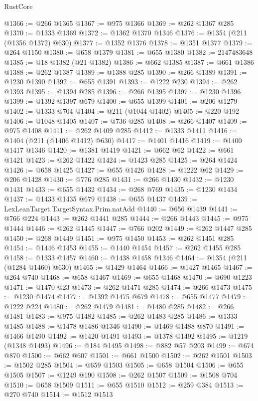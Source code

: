 \begin{lexlean}{RustCore}
\begin{coremodule}
@1366 := @266 @1365
@1367 := @975 @1366
@1369 := @262 @1367 @285
@1370 := @1333 @1369
@1372 := @1362 @1370 @1346
@1376 := @1354 (@211 (@1356 @1372) @630)
@1377 := @1352 @1376
@1378 := @1351 @1377
@1379 := @264 @1150
@1380 := @658 @1379
@1381 := @655 @1380
@1382 := 2147483648
@1385 := @18 @1382 (@21 @1382)
@1386 := @662 @1385
@1387 := @661 @1386
@1388 := @262 @1387
@1389 := @1388 @285
@1390 := @266 @1389
@1391 := @1230 @1390
@1392 := @655 @1391
@1393 := @1222 @230
@1394 := @262 @1393
@1395 := @1394 @285
@1396 := @266 @1395
@1397 := @1230 @1396
@1399 := @1392 @1397 @679
@1400 := @655 @1399
@1401 := @206 @1279
@1402 := @1333 @704
@1404 := @211 (@1044 @1402)
@1405 := @220 @192
@1406 := @1048 @1405
@1407 := @736 @285
@1408 := @266 @1407
@1409 := @975 @1408
@1411 := @262 @1409 @285
@1412 := @1333 @1411
@1416 := @1404 (@211 (@1406 @1412) @630)
@1417 := @1401 @1416
@1419 := @1400 @1417 @1346
@1420 := @1381 @1419
@1421 := @662 @62
@1422 := @661 @1421
@1423 := @262 @1422
@1424 := @1423 @285
@1425 := @264 @1424
@1426 := @658 @1425
@1427 := @655 @1426
@1428 := @1222 @62
@1429 := @206 @1428
@1430 := @776 @285
@1431 := @266 @1430
@1432 := @1230 @1431
@1433 := @655 @1432
@1434 := @268 @769
@1435 := @1230 @1434
@1437 := @1433 @1435 @679
@1438 := @655 @1437
@1439 := LexLeanTarget.TargetSyntax.Prim.natAdd
@1440 := @656 @1439
@1441 := @766 @224
@1443 := @262 @1441 @285
@1444 := @266 @1443
@1445 := @975 @1444
@1446 := @262 @1445
@1447 := @766 @202
@1449 := @262 @1447 @285
@1450 := @268 @1449
@1451 := @975 @1450
@1453 := @262 @1451 @285
@1454 := @1446 @1453
@1455 := @1440 @1454
@1457 := @262 @1455 @285
@1458 := @1333 @1457
@1460 := @1438 @1458 @1346
@1464 := @1354 (@211 (@1284 @1460) @630)
@1465 := @1429 @1464
@1466 := @1427 @1465
@1467 := @264 @740
@1468 := @658 @1467
@1469 := @655 @1468
@1470 := @690 @1223
@1471 := @1470 @23
@1473 := @262 @1471 @285
@1474 := @266 @1473
@1475 := @1230 @1474
@1477 := @1392 @1475 @679
@1478 := @655 @1477
@1479 := @1222 @224
@1480 := @262 @1479
@1481 := @1480 @285
@1482 := @266 @1481
@1483 := @975 @1482
@1485 := @262 @1483 @285
@1486 := @1333 @1485
@1488 := @1478 @1486 @1346
@1490 := @1469 @1488 @870
@1491 := @1466 @1490
@1492 := @1420 @1491
@1493 := @1378 @1492
@1495 := @1219 (@1348 @1493)
@1496 := @184 @1495
@1498 := @882 @57 @203
@1499 := @674 @870
@1500 := @662 @607
@1501 := @661 @1500
@1502 := @262 @1501
@1503 := @1502 @285
@1504 := @659 @1503
@1505 := @658 @1504
@1506 := @655 @1505
@1507 := @1249 @190
@1508 := @262 @1507
@1509 := @1508 @704
@1510 := @658 @1509
@1511 := @655 @1510
@1512 := @259 @384
@1513 := @270 @740
@1514 := @1512 @1513

\end{coremodule}
\end{lexlean}
